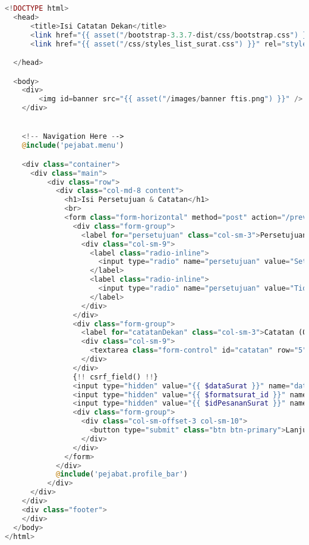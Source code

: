 \begin{lstlisting}[language=php,basicstyle=\tiny,caption=Tambah persetujuan dan catatan]
	<!DOCTYPE html>
  <head>
      <title>Isi Catatan Dekan</title>
      <link href="{{ asset("/bootstrap-3.3.7-dist/css/bootstrap.css") }}" rel="stylesheet" type="text/css" />
      <link href="{{ asset("/css/styles_list_surat.css") }}" rel="stylesheet" type="text/css">

  </head>

  <body>
    <div>
        <img id=banner src="{{ asset("/images/banner ftis.png") }}" />
    </div>


    <!-- Navigation Here -->
    @include('pejabat.menu')

    <div class="container">
      <div class="main">
          <div class="row">
            <div class="col-md-8 content">
              <h1>Isi Persetujuan & Catatan</h1>
              <br>
              <form class="form-horizontal" method="post" action="/previewCatatan">
                <div class="form-group">
                  <label for="persetujuan" class="col-sm-3">Persetujuan</label>
                  <div class="col-sm-9">
                    <label class="radio-inline">
                      <input type="radio" name="persetujuan" value="Setuju" checked required>Setuju
                    </label>
                    <label class="radio-inline">
                      <input type="radio" name="persetujuan" value="Tidak setuju">Tidak setuju
                    </label>
                  </div>
                </div>
                <div class="form-group">
                  <label for="catatanDekan" class="col-sm-3">Catatan (Opsional)</label>
                  <div class="col-sm-9">
                    <textarea class="form-control" id="catatan" row="5" name="catatan"></textarea>
                  </div>
                </div>
                {!! csrf_field() !!}
                <input type="hidden" value="{{ $dataSurat }}" name="dataSurat">
                <input type="hidden" value="{{ $formatsurat_id }}" name="formatsurat_id">
                <input type="hidden" value="{{ $idPesananSurat }}" name="idPesananSurat">
                <div class="form-group">
                  <div class="col-sm-offset-3 col-sm-10">
                    <button type="submit" class="btn btn-primary">Lanjutkan</button>
                  </div>
                </div>
              </form>
            </div>
            @include('pejabat.profile_bar')
          </div>
      </div>
    </div>
    <div class="footer">
    </div>
  </body>
</html>

\end{lstlisting}

